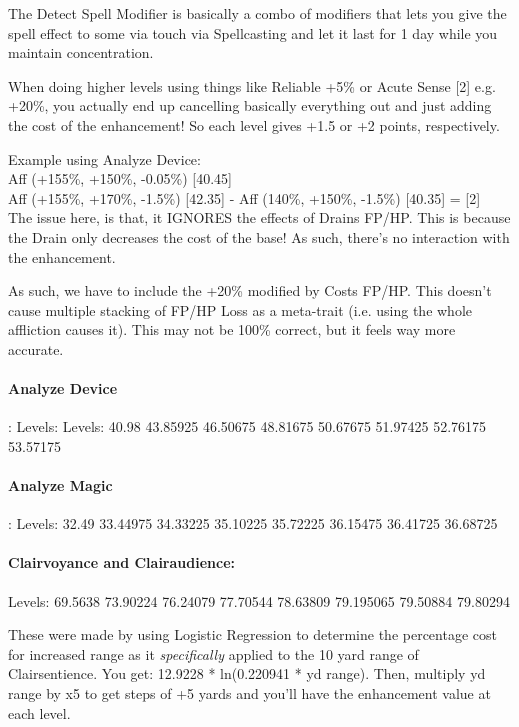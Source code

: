 \begin{multicols*}{2}
	The Detect Spell Modifier is basically a combo of modifiers that lets you give the spell effect to some via touch via Spellcasting and let it last for 1 day while you maintain concentration.
	
	When doing higher levels using things like Reliable +5\% or Acute Sense [2] e.g. +20\%, you actually end up cancelling basically everything out and just adding the cost of the enhancement! So each level gives +1.5 or +2 points, respectively.
	
	Example using Analyze Device:\\
	Aff (+155\%, +150\%, -0.05\%) [40.45]\\
	Aff (+155\%, +170\%, -1.5\%) [42.35] - Aff (140\%, +150\%, -1.5\%) [40.35] = [2]\\
	
	The issue here, is that, it IGNORES the effects of Drains FP/HP. This is because the Drain only decreases the cost of the base! As such, there's no interaction with the enhancement.
	
	As such, we have to include the +20\% modified by Costs FP/HP. This doesn't cause multiple stacking of FP/HP Loss as a meta-trait (i.e. using the whole affliction causes it). This may not be 100\% correct, but it feels way more accurate.
	
	\paragraph{Analyze Device}: Levels: Levels: 40.98 43.85925 46.50675 48.81675 50.67675 51.97425 52.76175 53.57175
	
	\paragraph{Analyze Magic}: Levels: 32.49 33.44975 34.33225 35.10225 35.72225 36.15475 36.41725 36.68725
	
		
	\paragraph{Clairvoyance and Clairaudience: } Levels: 69.5638 73.90224 76.24079 77.70544 78.63809 79.195065 79.50884 79.80294
	
	These were made by using Logistic Regression to determine the percentage cost for increased range as it \textit{specifically} applied to the 10 yard range of Clairsentience. You get: 12.9228 * ln(0.220941 * yd range). Then, multiply yd range by x5 to get steps of +5 yards and you'll have the enhancement value at each level.
	

\end{multicols*}
